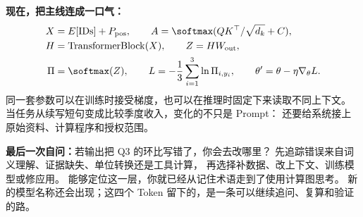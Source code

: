 \textbf{现在，把主线连成一口气：}
\[
\begin{aligned}
X&=E[\mathrm{IDs}]+P_{\rm pos},\qquad
A=\softmax(QK^\top/\sqrt{d_k}+C),\\
H&=\operatorname{TransformerBlock}(X),\qquad Z=HW_{\rm out},\\
\Pi&=\softmax(Z),\qquad L=-\frac13\sum_{i=1}^{3}\ln\Pi_{i,y_i},\qquad
\theta'=\theta-\eta\nabla_\theta L.
\end{aligned}
\]
同一套参数可以在训练时接受梯度，也可以在推理时固定下来读取不同上下文。
当任务从续写短句变成比较季度收入，变化的不只是 Prompt：
还要给系统接上原始资料、计算程序和授权范围。

\textbf{最后一次自问：}若输出把 Q3 的环比写错了，你会去改哪里？
先追踪错误来自词义理解、证据缺失、单位转换还是工具计算，
再选择补数据、改上下文、训练模型或修应用。
能够定位这一层，你就已经从记住术语走到了使用计算图思考。
新的模型名称还会出现；这四个 Token 留下的，是一条可以继续追问、复算和验证的路。
